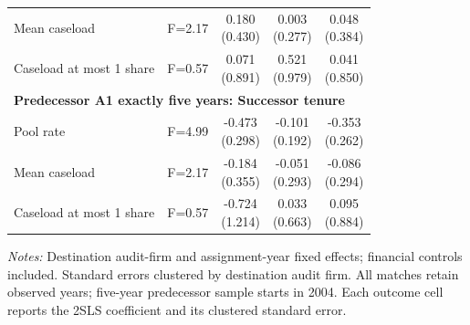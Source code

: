 \begin{table}[htbp]
\begin{threeparttable}
\begin{tabular}{p{}cccc}
Mean caseload & F=2.17 & \shortstack{0.180\\(0.430)} & \shortstack{0.003\\(0.277)} & \shortstack{0.048\\(0.384)} \\
Caseload at most 1 share & F=0.57 & \shortstack{0.071\\(0.891)} & \shortstack{0.521\\(0.979)} & \shortstack{0.041\\(0.850)} \\
\multicolumn{5}{l}{\textbf{Predecessor A1 exactly five years: Successor tenure}} \\
Pool rate & F=4.99 & \shortstack{-0.473\\(0.298)} & \shortstack{-0.101\\(0.192)} & \shortstack{-0.353\\(0.262)} \\
Mean caseload & F=2.17 & \shortstack{-0.184\\(0.355)} & \shortstack{-0.051\\(0.293)} & \shortstack{-0.086\\(0.294)} \\
Caseload at most 1 share & F=0.57 & \shortstack{-0.724\\(1.214)} & \shortstack{0.033\\(0.663)} & \shortstack{0.095\\(0.884)} \\
\bottomrule
\end{tabular}
\begin{tablenotes}\footnotesize
\item \raggedright \textit{Notes:} Destination audit-firm and assignment-year fixed effects; financial controls included. Standard errors clustered by destination audit firm. All matches retain observed years; five-year predecessor sample starts in 2004. Each outcome cell reports the 2SLS coefficient and its clustered standard error.
\end{tablenotes}
\end{threeparttable}
\end{table}
